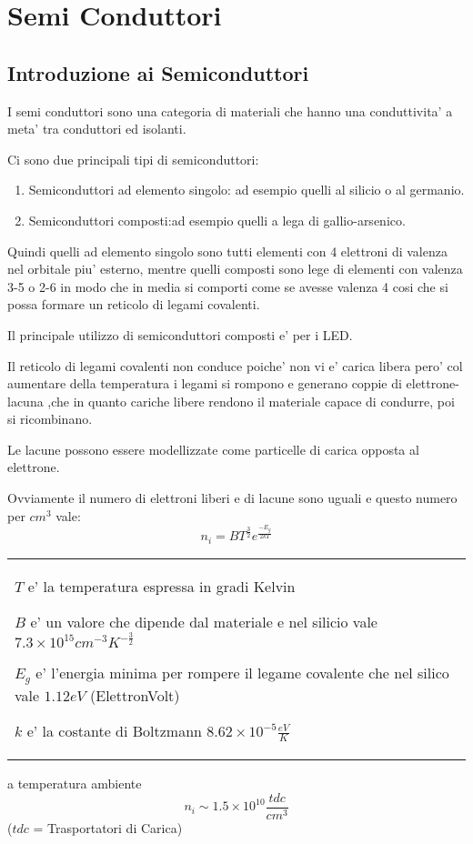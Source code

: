 \documentclass[\main/main.tex]{subfiles}
\begin{document}
\section{Semi Conduttori}
\subsection{Introduzione ai Semiconduttori}
I semi conduttori sono una categoria di materiali che hanno una conduttivita' a meta' tra conduttori ed isolanti.

Ci sono due principali tipi di semiconduttori:
\begin{enumerate}  
	\item Semiconduttori ad elemento singolo: ad esempio quelli al silicio o al germanio.
	\item Semiconduttori composti:ad esempio quelli a lega di gallio-arsenico.
\end{enumerate}
Quindi quelli ad elemento singolo sono tutti elementi con 4 elettroni di valenza nel orbitale piu' esterno, mentre quelli composti sono lege di elementi con valenza 3-5 o 2-6 in modo che in media si comporti come se avesse valenza 4 cosi che si possa formare un reticolo di legami covalenti.

Il principale utilizzo di semiconduttori composti e' per i LED.

Il reticolo di legami covalenti non conduce poiche' non vi e' carica libera pero' col aumentare della temperatura i legami si rompono e generano coppie di elettrone-lacuna ,che in quanto cariche libere rendono il materiale capace di condurre, poi si ricombinano.

Le lacune possono essere modellizzate come particelle di carica opposta al elettrone.

Ovviamente il numero di elettroni liberi e di lacune sono uguali e questo numero per $cm^3$ vale:
\[n_i = BT^{\frac{3}{2}}e^{\frac{-E_g}{2kT}}\]
\begin{tabular}{l}
	$T$ e' la temperatura espressa in gradi Kelvin
	
	$B$ e' un valore che dipende dal materiale e nel silicio vale $7.3 \times 10^{15} cm^{-3} K^{-\frac{3}{2}}$
	
	$E_g$ e' l'energia minima per rompere il legame covalente che nel silico vale $1.12 eV$ (ElettronVolt)
	
	$k$ e' la costante di Boltzmann $8.62 \times 10^{-5} \frac{eV}{K}$
\end{tabular}
a temperatura ambiente \[n_i \sim 1.5 \times 10^{10} \frac{tdc}{cm^3}\]
($tdc$ = Trasportatori di Carica)
\clearpage
\end{document}
